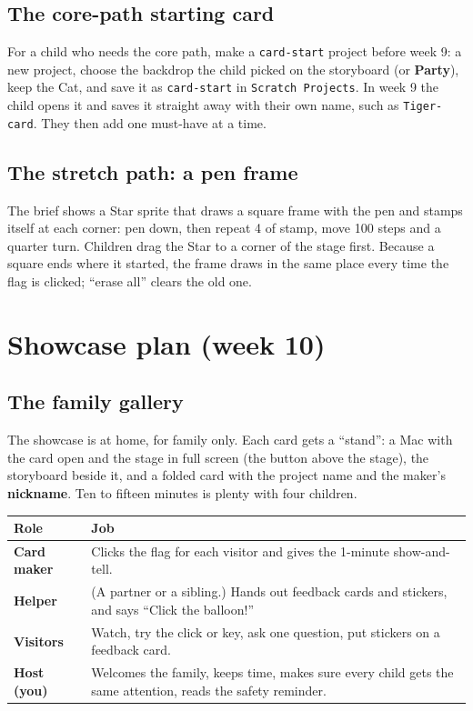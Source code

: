 \documentclass[track=junior,level=1,teacher]{kidscode}
\begin{document}
\subsection{The core-path starting card}
For a child who needs the core path, make a \texttt{card-start} project before week 9: a new project,
choose the backdrop the child picked on the storyboard (or \textbf{Party}), keep the Cat, and save it
as \texttt{card-start} in \texttt{Scratch Projects}. In week 9 the child opens it and saves it straight
away with their own name, such as \texttt{Tiger-card}. They then add one must-have at a time.

\subsection{The stretch path: a pen frame}
The brief shows a Star sprite that draws a square frame with the pen and stamps itself at each
corner: pen down, then repeat 4 of stamp, move 100 steps and a quarter turn. Children drag the Star
to a corner of the stage first. Because a square ends where it started, the frame draws in the same
place every time the flag is clicked; \enquote{erase all} clears the old one.

\section{Showcase plan (week 10)}

\subsection{The family gallery}
The showcase is at home, for family only. Each card gets a \enquote{stand}: a Mac with the card open and the stage in full screen (the button above the stage), the
storyboard beside it, and a folded card with the project name and the maker's \textbf{nickname}.
Ten to fifteen minutes is plenty with four children.

\begin{center}\small\renewcommand{\arraystretch}{1.3}
\begin{tabularx}{\linewidth}{@{}>{\bfseries}p{3.0cm}X@{}}
\toprule
Role & Job\\
\midrule
Card maker & Clicks the flag for each visitor and gives the 1-minute show-and-tell.\\
Helper & (A partner or a sibling.) Hands out feedback cards and stickers, and says \enquote{Click the balloon!}\\
Visitors & Watch, try the click or key, ask one question, put stickers on a feedback card.\\
Host (you) & Welcomes the family, keeps time, makes sure every child gets the same attention, reads the safety reminder.\\
\bottomrule
\end{tabularx}
\end{center}
\end{document}
